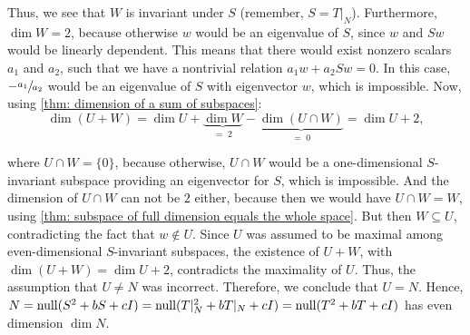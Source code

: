 \begin{prf}
  Thus, we see that $W$ is invariant under $S$ (remember, $S = T|_N$). Furthermore, $\dim W = 2$, because otherwise $w$ would be an eigenvalue of $S$, since $w$ and $Sw$ would be linearly dependent. This means that there would exist nonzero scalars $a_1$ and $a_2$, such that we have a nontrivial relation $a_1w + a_2 Sw = 0$. In this case, $-\sfrac{a_1}{a_2}$ would be an eigenvalue of $S$ with eigenvector $w$, which is impossible. Now, using \ref{thm: dimension of a sum of subspaces}:
  \begin{equation}
    \dim (U + W) = \dim U + \underbrace{\dim W}_{= \; 2} - \underbrace{\dim (U \cap W)}_{= \; 0} = \dim U + 2,
  \end{equation}

  where $U \cap W = \{0\}$, because otherwise, $U \cap W$ would be a one-dimensional $S$-invariant subspace providing an eigenvector for $S$, which is impossible. And the dimension of $U \cap W$ can not be $2$ either, because then we would have $U \cap W = W$, using \ref{thm: subspace of full dimension equals the whole space}. But then $W \subseteq U$, contradicting the fact that $w \notin U$. Since $U$ was assumed to be maximal among even-dimensional $S$-invariant subspaces, the existence of $U+W$, with $\dim (U+W)=\dim U+2$, contradicts the maximality of $U$.
  Thus, the assumption that $U \neq N$ was incorrect. Therefore, we conclude that $U = N$. Hence, $N= \operatorname{null} (S^2 +bS +cI)=\operatorname{null} (T|_N^2 +bT|_N +cI)=\operatorname{null} (T^2 +bT +cI)$ has even dimension $\dim N$.
\end{prf}


